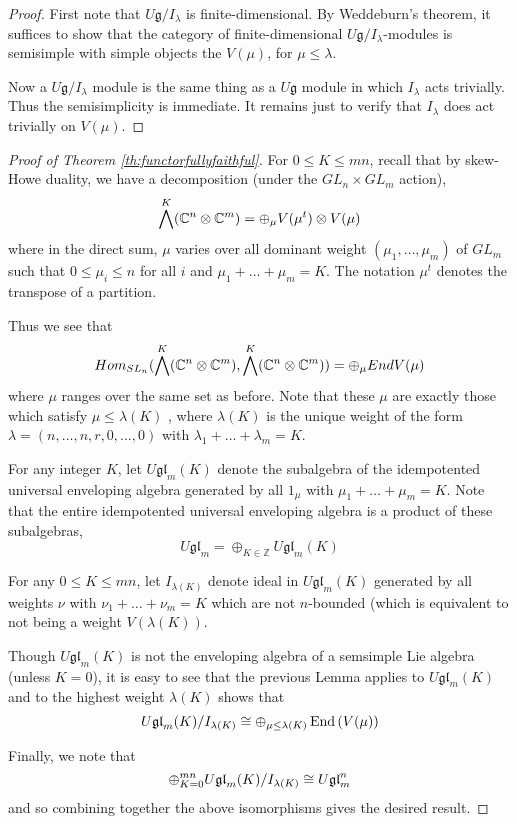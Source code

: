 \documentclass[11pt,leqno]{article}
\begin{document}
\begin{proof}
First note that $U \mathfrak g/ I_\lambda $ is finite-dimensional.  By Weddeburn's theorem, it suffices to show that the category of finite-dimensional $ U\mathfrak g / I_\lambda $-modules is semisimple with simple objects the $ V(\mu) $, for $ \mu \le \lambda $.

Now a $ U\mathfrak g / I_\lambda$ module is the same thing as a $ U\mathfrak g $ module in which $ I_\lambda $ acts trivially.  Thus the semisimplicity is immediate.  It remains just to verify that $ I_\lambda $ does act trivially on $ V(\mu)$.

\end{proof}

\begin{proof}[Proof of Theorem \ref{th:functorfullyfaithful}]
For $ 0 \le K \le mn $,  recall that by skew-Howe duality, we have a decomposition (under the $GL_n \times GL_m$ action),
$$
\bigwedge^K (\mathbb C^n \otimes \mathbb C^m) = \oplus_{\mu} V(\mu^t) \otimes V(\mu)
$$
where in the direct sum, $\mu $ varies over all dominant weight $ (\mu_1, \dots, \mu_m) $ of $ GL_m $ such that $ 0 \le \mu_i \le n $ for all $ i$  and $ \mu_1 + \dots + \mu_m = K $.  The notation $ \mu^t $ denotes the transpose of a partition.

Thus we see that
$$
Hom_{SL_n} (\bigwedge^K(\mathbb C^n \otimes \mathbb C^m), \bigwedge^K(\mathbb C^n \otimes \mathbb C^m)) = 
\oplus_{\mu} End V(\mu) 
$$
where $ \mu $ ranges over the same set as before.  Note that these $\mu $ are exactly those which satisfy $ \mu \le \lambda(K) $ , where $ \lambda(K) $ is the unique weight of the form $\lambda =  (n, \dots, n, r, 0, \dots, 0) $ with $ \lambda_1 + \dots + \lambda_m = K $.

For any integer $ K $, let $ U \mathfrak{gl}_m(K) $ denote the subalgebra of the idempotented universal enveloping algebra generated by all $ 1_\mu $ with $ \mu_1 + \dots + \mu_m = K $.  Note that the entire idempotented universal enveloping algebra is a product of these subalgebras, 
$$
U \mathfrak{gl}_m = \oplus_{K \in \mathbb Z} U \mathfrak{gl}_m(K)
$$

For any $ 0 \le K \le mn $, let $ I_{\lambda(K)} $ denote ideal in $ U \mathfrak{gl}_m(K)$ generated by all weights $ \nu $ with $ \nu_1 + \dots + \nu_m = K $ which are not $ n$-bounded (which is equivalent to not being a weight $ V(\lambda(K)) $.

Though $ U\mathfrak{gl}_m(K) $ is not the enveloping algebra of a semsimple Lie algebra (unless $ K = 0 $), it is easy to see that the previous Lemma applies to $ U\mathfrak{gl}_m(K) $ and to the highest weight $\lambda(K) $ shows that
$$
U\mathfrak{gl}_m(K) / I_{\lambda(K)} \cong \oplus_{\mu \le \lambda(K)} \operatorname{End}\left(V(\mu)\right)
$$

Finally, we note that 
$$
\oplus_{K= 0}^{mn} U\mathfrak{gl}_m(K) / I_{\lambda(K)} \cong U\mathfrak{gl}_{m}^n 
$$
and so combining together the above isomorphisms gives the desired result.

\end{proof} 
\end{document}
